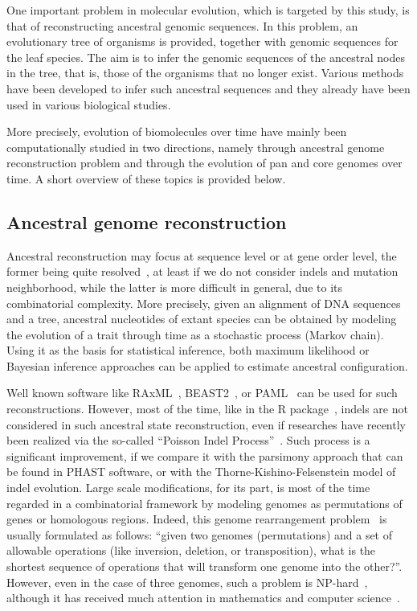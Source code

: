 \documentclass[runningheads,a4paper]{llncs}
\begin{document}
One important problem in molecular evolution, which is targeted by this study, is that of reconstructing ancestral genomic sequences. 
In this problem, an evolutionary tree of organisms is provided, together with genomic sequences for the leaf species. 
The aim is to infer the genomic sequences of the ancestral nodes in the tree, that is, those of the organisms that no longer exist. 
Various methods have been developed to infer such ancestral sequences and they already have been used in various biological studies. 

More precisely, evolution of biomolecules over time have mainly been computationally studied in two directions, namely through ancestral genome reconstruction problem and through the evolution of pan and core genomes over time. A short overview of these topics is provided below.

\subsection{Ancestral genome reconstruction}

Ancestral reconstruction may focus at sequence level or at gene order level, the former being quite resolved~\cite{ma2008dupcar,gagnon2012flexible,jones2012anges,ma2006reconstructing,10.1109/TCBB.2014.2309602,blanchette2008computational,rascol2007ancestral,larget2005bayesian,hannenhalli1995genome}, at least if we do not consider indels and mutation neighborhood, while the latter is more difficult in general, due to its combinatorial complexity. More precisely, given an alignment of DNA sequences and a tree, ancestral nucleotides of extant species can be obtained by modeling the evolution of a trait through time as a stochastic process (Markov chain). Using it as the basis for statistical inference, both maximum likelihood or Bayesian inference approaches can be applied to estimate ancestral configuration. 

Well known software like RAxML~\cite{stamatakis2014raxml}, BEAST2~\cite{bouckaert2014beast}, or PAML~\cite{yang2000phylogenetic} can be used for such reconstructions. However, most of the time, like in the R package~\cite{paradis2004ape}, indels are not considered in such ancestral state reconstruction, even if researches have recently been realized via the so-called ``Poisson Indel Process''~\cite{bouchard2013evolutionary}. Such process is a significant improvement, if we compare it with the parsimony approach that can be found in PHAST software, or with the Thorne-Kishino-Felsenstein model of indel evolution. Large scale modifications, for its part, is most of the time regarded in a combinatorial framework by modeling genomes as permutations of genes or homologous regions. Indeed, this genome rearrangement problem~\cite{watterson1982chromosome} is usually formulated as follows: ``given two genomes (permutations) and a set of allowable operations (like inversion, deletion, or transposition), what is the shortest sequence of operations that will transform one genome into the other?''. However, even in the case of three genomes, such a problem is NP-hard~\cite{even1981minimum}, although it has received much attention in mathematics and computer science~\cite{fertin2009combinatorics}.
\end{document}
